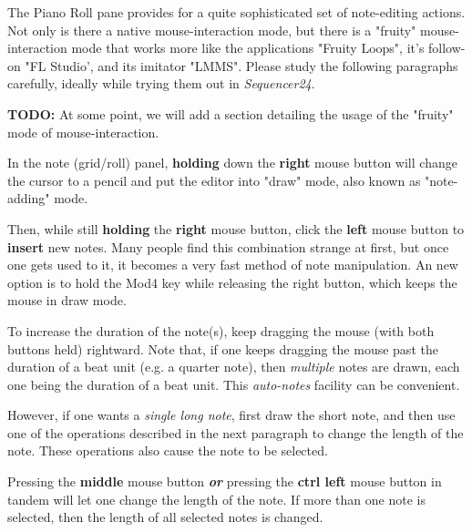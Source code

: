    The Piano Roll pane provides for a quite sophisticated set of note-editing
   actions.  Not only is there a native mouse-interaction mode, but there is
   a "fruity" mouse-interaction mode that works more like the applications
   "Fruity Loops", it's follow-on "FL Studio', and its imitator "LMMS".
   Please study the following paragraphs carefully, ideally while
   trying them out in \textsl{Sequencer24}.

   \textbf{TODO:}
   At some point, we will add a section detailing the usage of the "fruity"
   mode of mouse-interaction.

	In the note (grid/roll) panel, \textbf{holding}
	down the \textbf{right} mouse button will change the cursor
	to a pencil and put the editor into "draw" mode, also known as
   "note-adding" mode.
   
   Then, while still \textbf{holding} the \textbf{right} mouse button, click
   the \textbf{left} mouse button to \textbf{insert} new notes.  Many people
   find this combination strange at first, but once one gets used to it, it
   becomes a very fast method of note manipulation.  An new option is to
   hold the Mod4 key while releasing the right button, which keeps the mouse
   in draw mode.

   To increase the duration of the note(s), keep dragging the mouse (with
   both buttons held) rightward.
   Note that, if one keeps dragging the mouse past the duration of a
   beat unit (e.g. a quarter note), then \textsl{multiple} notes are drawn,
   each one being the duration of a beat unit.  This \textsl{auto-notes}
   facility can be convenient.
   
   However, if one wants a \textsl{single long note}, first draw the
   short note, and then use one of the operations described in the next
   paragraph to change the length of the note.  These operations also cause
   the note to be selected.

   Pressing the \textbf{middle} mouse button \textbf{\textsl{or}}
   pressing the \textbf{ctrl left} mouse button in tandem will let one change 
	the length of the note. 
   If more than one note is selected, then the length of all selected notes
   is changed.
   
